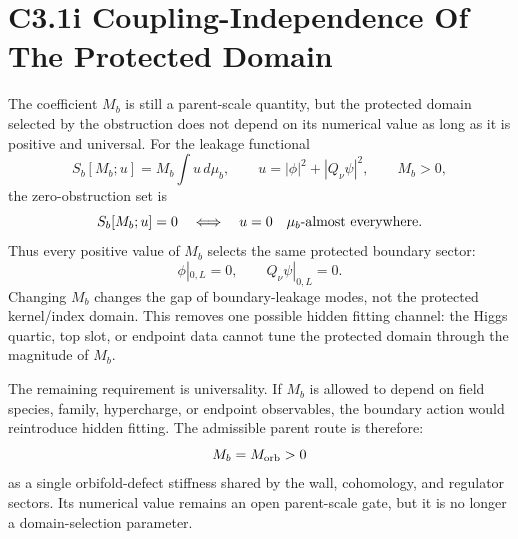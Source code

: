 \documentclass[11pt]{article}
\begin{document}
\section{C3.1i Coupling-Independence Of The Protected Domain}
The coefficient $M_b$ is still a parent-scale quantity, but the protected
domain selected by the obstruction does not depend on its numerical value as
long as it is positive and universal.  For the leakage functional
\begin{equation}
S_b[M_b;u]
=M_b\int u\,d\mu_b,
\qquad
u=|\phi|^2+|Q_\nu\psi|^2,
\qquad
M_b>0 ,
\end{equation}
the zero-obstruction set is
\begin{equation}
S_b[M_b;u]=0
\quad\Longleftrightarrow\quad
u=0\quad \mu_b\hbox{-almost everywhere} .
\end{equation}
Thus every positive value of $M_b$ selects the same protected boundary sector:
\begin{equation}
\phi|_{0,L}=0,
\qquad
Q_\nu\psi|_{0,L}=0 .
\end{equation}
Changing $M_b$ changes the gap of boundary-leakage modes, not the protected
kernel/index domain.  This removes one possible hidden fitting channel: the
Higgs quartic, top slot, or endpoint data cannot tune the protected domain
through the magnitude of $M_b$.

The remaining requirement is universality.  If $M_b$ is allowed to depend on
field species, family, hypercharge, or endpoint observables, the boundary action
would reintroduce hidden fitting.  The admissible parent route is therefore:
\begin{equation}
M_b=M_{\rm orb}>0
\end{equation}
as a single orbifold-defect stiffness shared by the wall, cohomology, and
regulator sectors.  Its numerical value remains an open parent-scale gate, but
it is no longer a domain-selection parameter.
\end{document}
